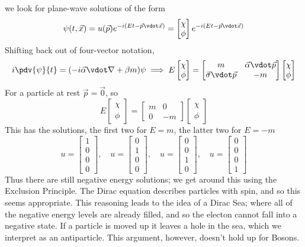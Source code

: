 we look for plane-wave solutions of the form
\[ \psi(t, \vec{x}) = u(\vec{p}) e^{-i(Et - \vec{p} \vdot \vec{x})} =
\begin{bmatrix}
  \chi \\ \phi
\end{bmatrix}
e^{-i(Et - \vec{p} \vdot \vec{x})}
\]
Shifting back out of four-vector notation,
\[ i \pdv{\psi}{t} = (-i \vec{\alpha} \vdot \nabla + \beta m) \psi \implies E
\begin{bmatrix}
  \chi \\ \phi
\end{bmatrix}
=
\begin{bmatrix}
  m & \vec{\alpha} \vdot \vec{p} \\ \vec{\sigma} \vdot \vec{p} & -m
\end{bmatrix}
\begin{bmatrix}
  \chi \\ \phi
\end{bmatrix}
\]
For a particle at rest $\vec{p}=\vec{0}$, so
\begin{equation}
  \label{eq:89}
  E \begin{bmatrix}
  \chi \\ \phi
\end{bmatrix}
=
\begin{bmatrix}
  m & 0 \\ 0 & -m
\end{bmatrix}
\begin{bmatrix}
  \chi \\ \phi
\end{bmatrix}
\end{equation}
This has the solutions, the first two for $E=m$, the latter two for $E=-m$
\[ u =
\begin{bmatrix}
  1 \\ 0 \\ 0 \\ 0
\end{bmatrix}, \quad u = \begin{bmatrix}
  0 \\ 1 \\ 0 \\ 0
\end{bmatrix}, \quad
u =
\begin{bmatrix}
  0 \\ 0 \\ 1 \\ 0
\end{bmatrix}, \quad u = \begin{bmatrix}
  0 \\ 0 \\ 0 \\ 1
\end{bmatrix}
\]
Thus there are still negative energy solutions; we get around this
using the Exclusion Principle. The Dirac equation describes particles
with spin, and so this seems appropriate. This reasoning leads to the
idea of a Dirac Sea; where all of the negative energy levels are
already filled, and so the electon cannot fall into a negative
state. If a particle is moved up it leaves a hole in the sea, which we
interpret as an antiparticle. This argument, however, doesn't hold up
for Bosons.

